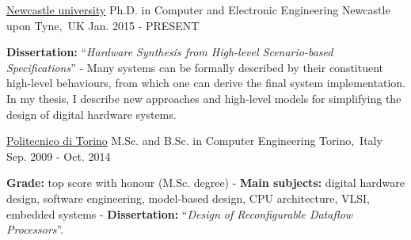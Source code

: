 
\begin{cventries}


\cventry
{\href{https://www.ncl.ac.uk/}{\color{myblue}Newcastle university}} %
{Ph.D. in Computer and Electronic Engineering} %
{Newcastle upon Tyne,~UK} %
{Jan. 2015 - PRESENT} %
{ %
\begin{cvitems}
\textbf{Dissertation:} ``\textit{Hardware Synthesis from High-level 
Scenario-based Specifications}'' - Many systems can be formally described 
by their constituent high-level behaviours, from which one can derive the final 
system implementation. In my thesis, I describe new approaches and high-level 
models for simplifying the design of digital hardware systems.
\end{cvitems}
}


\cventry
{\href{https://www.polito.it/?lang=en}{\color{myblue}Politecnico di Torino}}
{M.Sc. and B.Sc. in Computer Engineering}
{Torino,~Italy}
{Sep. 2009 - Oct. 2014}
{
\begin{cvitems}
\textbf{Grade:} top score with honour (M.Sc. degree) - \textbf{Main subjects:} 
digital hardware design, software engineering, model-based design, CPU 
architecture, VLSI, embedded systems - \textbf{Dissertation:} ``\emph{Design of 
Reconfigurable Dataflow Processors}''.
\end{cvitems}
}


\end{cventries}